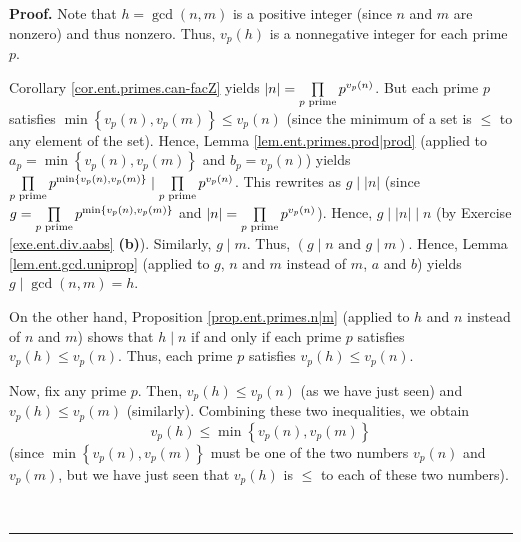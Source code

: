 \documentclass[numbers=enddot,12pt,final,onecolumn,notitlepage]{scrartcl}%
\numberwithin{exer}{subsection}
\theoremstyle{definition}
\newenvironment{proof}[1][Proof]{\noindent\textbf{#1.} }{\ \rule{0.5em}{0.5em}}
\let\prodnonlimits\prod
\renewcommand{\prod}{\prodnonlimits\limits}
\begin{document}
\begin{proof}
Note that $h=\gcd\left(  n,m\right)  $ is a positive integer (since $n$ and
$m$ are nonzero) and thus nonzero. Thus, $v_{p}\left(  h\right)  $ is a
nonnegative integer for each prime $p$.

Corollary \ref{cor.ent.primes.can-facZ} yields $\left\vert n\right\vert
=\prod\limits_{p\text{ prime}}p^{v_{p}\left(  n\right)  }$. But each prime $p$
satisfies \newline$\min\left\{  v_{p}\left(  n\right)  ,v_{p}\left(  m\right)
\right\}  \leq v_{p}\left(  n\right)  $ (since the minimum of a set is $\leq$
to any element of the set). Hence, Lemma \ref{lem.ent.primes.prod|prod}
(applied to $a_{p}=\min\left\{  v_{p}\left(  n\right)  ,v_{p}\left(  m\right)
\right\}  $ and $b_{p}=v_{p}\left(  n\right)  $) yields $\prod\limits_{p\text{
prime}}p^{\min\left\{  v_{p}\left(  n\right)  ,v_{p}\left(  m\right)
\right\}  }\mid\prod\limits_{p\text{ prime}}p^{v_{p}\left(  n\right)  }$. This
rewrites as $g\mid\left\vert n\right\vert $ (since $g=\prod\limits_{p\text{
prime}}p^{\min\left\{  v_{p}\left(  n\right)  ,v_{p}\left(  m\right)
\right\}  }$ and $\left\vert n\right\vert =\prod\limits_{p\text{ prime}%
}p^{v_{p}\left(  n\right)  }$). Hence, $g\mid\left\vert n\right\vert \mid n$
(by Exercise \ref{exe.ent.div.aabs} \textbf{(b)}). Similarly, $g\mid m$. Thus,
$\left(  g\mid n\text{ and }g\mid m\right)  $. Hence, Lemma
\ref{lem.ent.gcd.uniprop} (applied to $g$, $n$ and $m$ instead of $m$, $a$ and
$b$) yields $g\mid\gcd\left(  n,m\right)  =h$.

On the other hand, Proposition \ref{prop.ent.primes.n|m} (applied to $h$ and
$n$ instead of $n$ and $m$) shows that $h\mid n$ if and only if each prime $p$
satisfies $v_{p}\left(  h\right)  \leq v_{p}\left(  n\right)  $. Thus, each
prime $p$ satisfies $v_{p}\left(  h\right)  \leq v_{p}\left(  n\right)  $.

Now, fix any prime $p$. Then, $v_{p}\left(  h\right)  \leq v_{p}\left(
n\right)  $ (as we have just seen) and $v_{p}\left(  h\right)  \leq
v_{p}\left(  m\right)  $ (similarly). Combining these two inequalities, we
obtain%
\[
v_{p}\left(  h\right)  \leq\min\left\{  v_{p}\left(  n\right)  ,v_{p}\left(
m\right)  \right\}
\]
(since $\min\left\{  v_{p}\left(  n\right)  ,v_{p}\left(  m\right)  \right\}
$ must be one of the two numbers $v_{p}\left(  n\right)  $ and $v_{p}\left(
m\right)  $, but we have just seen that $v_{p}\left(  h\right)  $ is $\leq$ to
each of these two numbers).


\end{proof}
\end{document}
